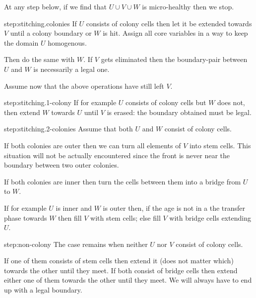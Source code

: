 \documentclass[11pt]{memoir}
\theoremstyle{definition} %
\begin{document}
\begin{Proof}
  At any step below, if we find that \( U\cup V\cup W \) is micro-healthy then we stop.

\begin{step+}{step:stitching.colonies}
  If \( U \) consists of colony cells then let it be extended towards \( V \) until a colony boundary or \( W \)
  is hit.
  Assign all core variables in a way to keep the domain \( U \) homogenous.

  Then do the same with \( W \).
  If \( V \) gets eliminated then the boundary-pair
  between \( U \) and \( W \) is necessarily a legal one.
\end{step+}
Assume now that the above operations have still left \( V \).

\begin{step+}{step:stitching.1-colony}
  If for example \( U \) consists of colony cells but \( W \) does not, then extend \( W \) towards \( U \)
  until \( V \) is erased: the boundary obtained must be legal.
\end{step+}

\begin{step+}{step:stitching.2-colonies}
Assume that both \( U \) and \( W \) consist of colony cells.
\end{step+}
\begin{prooof}
  If both colonies are outer then we can turn all elements of \( V \) into stem cells.
  This situation will not be actually encountered since the front is never near the boundary between
  two outer colonies.

  If both colonies are inner then turn the cells between them into a bridge from \( U \) to \( W \).

  If for example \( U \) is inner and \( W \) is outer then, if the age is not in a the transfer phase
  towards \( W \) then fill \( V \) with stem cells; else
  fill \( V \) with bridge cells extending \( U \).
\end{prooof} %

\begin{step+}{step:non-colony}
  The case remains when neither \( U \) nor \( V \) consist of colony cells.
\end{step+}
\begin{prooof}
  If one of them consists of stem cells then extend it (does not matter which)
  towards the other until they meet.
  If both consist of bridge cells then extend either one of them towards the other until they meet.
  We will always have to end up with a legal boundary.
\end{prooof} %
\end{Proof}
\end{document}

